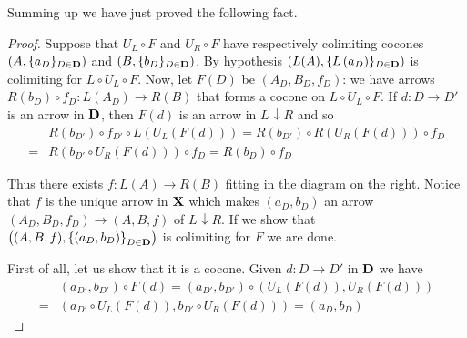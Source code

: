 \documentclass[3p]{elsarticle}
\def\B{\textbf {\textup{B}}}
\def\D{\textbf {\textup{D}}}
\def\X{\textbf {\textup{X}}}
\def\A{\textbf {\textup{A}}}
\renewcommand{\comma}[2]{#1\hspace{1pt} {\downarrow}#2}
\theoremstyle{remark}
\theoremstyle{definition}
\begin{document}
Summing up we have just proved the following fact.


\begin{proof}
	Suppose that $U_L\circ F$ and $U_R\circ F$ have respectively colimiting cocones  $\left(A, \{a_D\}_{D\in \D}\right)$ and $\left(B, \{b_D\}_{D\in \D}\right)$. By hypothesis $\left(L(A), \{L\left(a_D\right)\}_{D\in \D}\right)$ is colimiting for $L\circ U_L\circ F$. Now, let $F(D)$ be $(A_D, B_D, f_D)$:
	we have arrows $R(b_D)\circ f_D\colon L(A_D)\to R(B)$ that forms a cocone on $L\circ U_L\circ F$. If $d\colon D\to D'$ is an arrow in $\D$, then $F(d)$ is an arrow in $\comma{L}{R}$ and so
	\begin{align*}
		&R\left(b_{D'}\right)\circ f_{D'}\circ L(U_L(F(d)))=R\left(b_{D'}\right)\circ R\left(U_R\left(F(d)\right)\right)\circ f_D\\=&R\left(b_{D'}\circ U_R\left(F(d)\right)\right)\circ f_D=R\left(b_D\right)\circ f_D
	\end{align*}
	
	\begin{minipage}[l]{.75\linewidth}
	Thus there exists $f\colon L(A)\rightarrow R(B)$ fitting in the diagram on the right. Notice that $f$ is the unique arrow in $\X$ which makes $\left(a_D, b_D\right)$ an arrow $\left(A_D, B_D, f_D\right)\to \left(A, B, f\right)$ of $\comma{L}{R}$. If we show that $\left((A, B, f), \left\{(a_D, b_D)\right\}_{D\in \D}\right)$ is colimiting for $F$ we are done.
	\end{minipage}
	\hfill
	\begin{minipage}[r]{.2\linewidth}
	\end{minipage}
	
	First of all, let us show that it is a cocone. Given $d\colon D\to D'$ in $\D$ we have
	\begin{align*}
		&\left(a_{D'}, b_{D'}\right)\circ F(d)=	\left(a_{D'}, b_{D'}\right)\circ \left(U_L(F(d)), U_R(F(d))\right)\\=&\left( a_{D'}\circ U_L(F(d)),  b_{D'}\circ U_R(F(d)) \right)=\left(a_D, b_D\right)
	\end{align*}
	

\end{proof}
\end{document}
